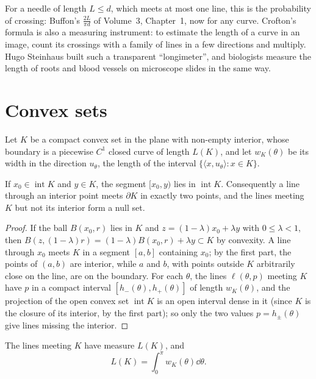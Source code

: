 For a needle of length $L\le d$, which meets at most one line, this is the probability of crossing: Buffon's $\frac{2L}{\pi d}$ of Volume~3, Chapter~1, now for any curve. Crofton's formula is
also a measuring instrument: to estimate the length of a curve in an image, count its crossings with a family of lines in a few directions and multiply. Hugo Steinhaus built such a
transparent ``longimeter'', and biologists measure the length of roots and blood vessels on microscope slides in the same way.

\section{Convex sets}

Let $K$ be a compact convex set in the plane with non-empty interior, whose boundary is a piecewise $C^1$ closed curve of length $L(K)$, and let $w_K(\theta)$ be its width in the direction $u_\theta$, the
length of the interval $\{\langle x,u_\theta\rangle:x\in K\}$.

\begin{lemma}\label{lem:convexline}
If $x_0\in\operatorname{int}K$ and $y\in K$, the segment $[x_0,y)$ lies in $\operatorname{int}K$. Consequently a line through an interior point meets $\partial K$ in exactly two points, and the lines meeting $K$ but not
its interior form a null set.
\end{lemma}

\begin{proof}
If the ball $B(x_0,r)$ lies in $K$ and $z=(1-\lambda)x_0+\lambda y$ with $0\le\lambda<1$, then $B(z,(1-\lambda)r)=(1-\lambda)B(x_0,r)+\lambda y\subset K$ by convexity. A line through $x_0$ meets $K$ in a segment $[a,b]$ containing $x_0$; by
the first part, the points of $(a,b)$ are interior, while $a$ and $b$, with points outside $K$ arbitrarily close on the line, are on the boundary. For each $\theta$, the lines $\ell(\theta,p)$ meeting $K$ have $p$ in a compact interval
$[h_-(\theta),h_+(\theta)]$ of length $w_K(\theta)$, and the projection of the open convex set $\operatorname{int}K$ is an open interval dense in it (since $K$ is the closure of its interior, by the first part); so
only the two values $p=h_\pm(\theta)$ give lines missing the interior.
\end{proof}

\begin{theorem}\label{thm:cauchycrofton}
The lines meeting $K$ have measure $L(K)$, and
\[L(K)=\int_0^\pi w_K(\theta)\dd\theta.\]
\end{theorem}

